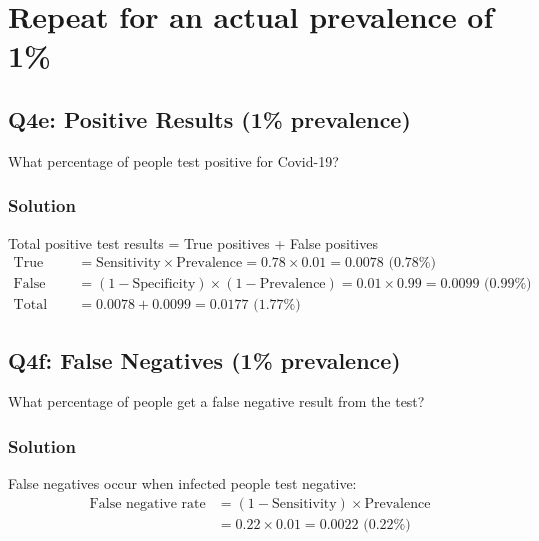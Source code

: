 \documentclass{article}
\begin{document}
\section*{Repeat for an actual prevalence of 1\%}

\subsection*{Q4e: Positive Results (1\% prevalence)}

What percentage of people test positive for Covid-19?

\subsubsection*{Solution}

Total positive test results = True positives + False positives
\begin{align}
\text{True positives} &= \text{Sensitivity} \times \text{Prevalence} = 0.78 \times 0.01 = 0.0078 \text{ (0.78\%)}\\
\text{False positives} &= (1 - \text{Specificity}) \times (1 - \text{Prevalence}) = 0.01 \times 0.99 = 0.0099 \text{ (0.99\%)}\\
\text{Total positive tests} &= 0.0078 + 0.0099 = 0.0177 \text{ (1.77\%)}
\end{align}


\subsection*{Q4f: False Negatives (1\% prevalence)}

What percentage of people get a false negative result from the test?

\subsubsection*{Solution}

False negatives occur when infected people test negative:
\begin{align}
\text{False negative rate} &= (1 - \text{Sensitivity}) \times \text{Prevalence}\\
&= 0.22 \times 0.01 = 0.0022 \text{ (0.22\%)}
\end{align}

\end{document}
